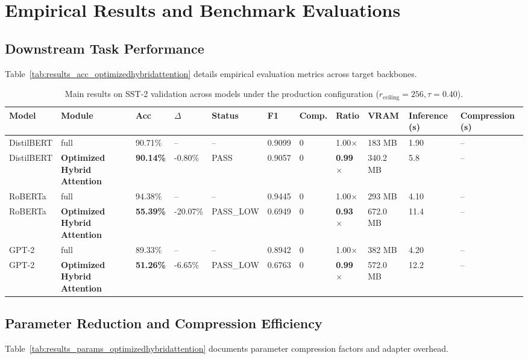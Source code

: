 \section{Empirical Results and Benchmark Evaluations}

\subsection{Downstream Task Performance}
Table~\ref{tab:results_acc_optimizedhybridattention} details empirical evaluation metrics across target backbones.

\begin{table}[t]
\centering
\small
\begin{tabular}{lllllllllll}
\toprule
\textbf{Model} & \textbf{Module} & \textbf{Acc} & \textbf{$\Delta$} & \textbf{Status} & \textbf{F1} & \textbf{Comp.} & \textbf{Ratio} & \textbf{VRAM} & \textbf{Inference (s)} & \textbf{Compression (s)} \\
\midrule
DistilBERT & full & 90.71\% & -- & -- & 0.9099 & 0 & 1.00$\times$ & 183 MB & 1.90 & -- \\
DistilBERT & \textbf{Optimized Hybrid Attention} & \textbf{90.14\%} & -0.80\% & PASS & 0.9057 & 0 & \textbf{0.99$\times$} & 340.2 MB & 5.8 & -- \\
RoBERTa & full & 94.38\% & -- & -- & 0.9445 & 0 & 1.00$\times$ & 293 MB & 4.10 & -- \\
RoBERTa & \textbf{Optimized Hybrid Attention} & \textbf{55.39\%} & -20.07\% & PASS_LOW & 0.6949 & 0 & \textbf{0.93$\times$} & 672.0 MB & 11.4 & -- \\
GPT-2 & full & 89.33\% & -- & -- & 0.8942 & 0 & 1.00$\times$ & 382 MB & 4.20 & -- \\
GPT-2 & \textbf{Optimized Hybrid Attention} & \textbf{51.26\%} & -6.65\% & PASS_LOW & 0.6763 & 0 & \textbf{0.99$\times$} & 572.0 MB & 12.2 & -- \\
\bottomrule
\end{tabular}
\caption{Main results on SST-2 validation across models under the production configuration ($r_{\mathrm{ceiling}}=256, \tau=0.40$).}
\label{tab:main_sst2}
\end{table}

\subsection{Parameter Reduction and Compression Efficiency}
Table~\ref{tab:results_params_optimizedhybridattention} documents parameter compression factors and adapter overhead.

